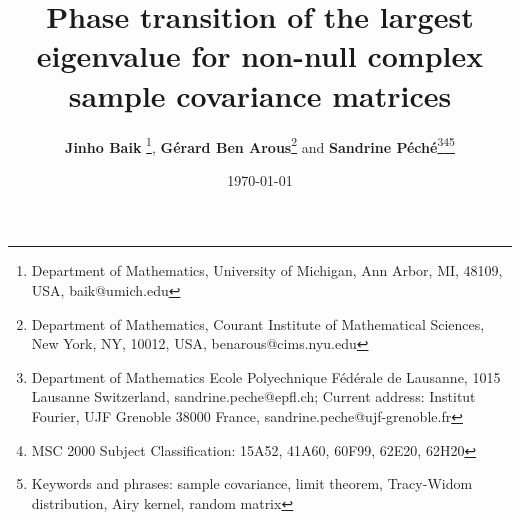 \documentclass[11pt]{article}
\begin{document}
\title{\bf Phase transition of the largest eigenvalue for
non-null complex sample covariance matrices}

\author{{\bf Jinho Baik}
\footnote{Department of Mathematics, University of Michigan, Ann
Arbor, MI, 48109, USA, baik@umich.edu}, {\bf G\'erard Ben
Arous}\footnote{Department of Mathematics, Courant Institute of
Mathematical Sciences, New York, NY, 10012, USA,
benarous@cims.nyu.edu} and {\bf Sandrine
P\'ech\'e}\footnote{Department of Mathematics Ecole Polyechnique
F\'ed\'erale de Lausanne, 1015 Lausanne Switzerland,
sandrine.peche@epfl.ch; Current address:  Institut Fourier, UJF
Grenoble 38000 France,
sandrine.peche@ujf-grenoble.fr}\footnote{MSC 2000 Subject
Classification: 15A52, 41A60, 60F99, 62E20,
62H20}\footnote{Keywords and phrases: sample covariance, limit
theorem, Tracy-Widom distribution, Airy kernel, random matrix}}


\date{\today}


\maketitle
\newtheorem{theo}{Theorem}[section]
\newtheorem{prop}{Proposition}[section]
\newtheorem{lemma}{Lemma}[section]
\newtheorem{cor}{Corollary}[section]
\newtheorem{conjecture}{Conjecture}[section]
\newtheorem{definition}{Definition}[section]
\newcommand{\bconj}{\begin{conjecture}}
\newcommand{\econj}{\end{conjecture}}
\newcommand{\bdefi}{\begin{definition}}
\newcommand{\edefi}{\end{definition}}
\newcommand{\bt}{\begin{theo}}
\newcommand{\Si}{\Sigma}
\newcommand{\et}{\end{theo}}
\newcommand{\bp}{\begin{prop}}
\newcommand{\ep}{\end{prop}}
\newcommand{\bl}{\begin{lemme}}
\newcommand{\el}{\end{lemme}}
\newcommand{\be}{\begin{equation}}
\newcommand{\ee}{\end{equation}}
\newenvironment{Cases}{\begin{array}\{{lL.}}{\end{array}}

\newcommand{\qq}{q}


\theoremstyle{remark}
\newtheorem*{rem}{Remark}
\newtheorem{remark}{Remark}[section]
\newtheorem*{nrem}{\textbf{Notational Remark}}
\newtheorem*{Conjecture}{\textbf{Conjecture}}
\end{document}
